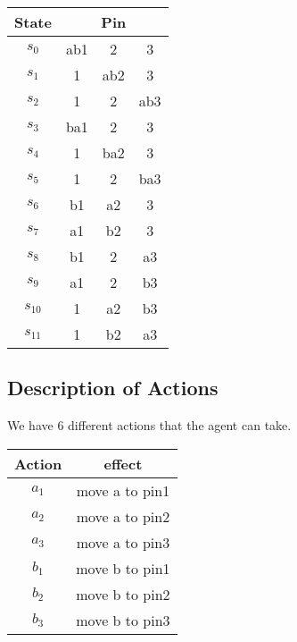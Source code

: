 \documentclass[a4paper]{article}
\begin{document}
\begin{tabular}{ c|c|c|c}
	State & \multicolumn{3}{c}{Pin} \\
	\hline
	$s_{0}$ & ab1 & 2 & 3 \\
	$s_{1}$ & 1 & ab2 & 3 \\
	$s_{2}$ & 1 & 2 & ab3 \\
	$s_{3}$ & ba1 & 2 & 3 \\
	$s_{4}$ & 1 & ba2 & 3 \\
	$s_{5}$ & 1 & 2 & ba3 \\
	$s_{6}$ & b1 & a2 & 3 \\
	$s_{7}$ & a1 & b2 & 3 \\
	$s_{8}$ & b1 & 2 & a3 \\
	$s_{9}$ & a1 & 2 & b3 \\
	$s_{10}$ & 1 & a2 & b3 \\
	$s_{11}$ & 1 & b2 & a3

\end{tabular}

\subsection{Description of Actions}
We have 6 different actions that the agent can take. \\

\begin{tabular}{c|c}
Action & effect \\
\hline
$a_{1}$ & move a to pin1 \\
$a_{2}$ & move a to pin2 \\
$a_{3}$ & move a to pin3 \\
$b_{1}$ & move b to pin1 \\
$b_{2}$ & move b to pin2 \\
$b_{3}$ & move b to pin3
\end{tabular}
\end{document}
